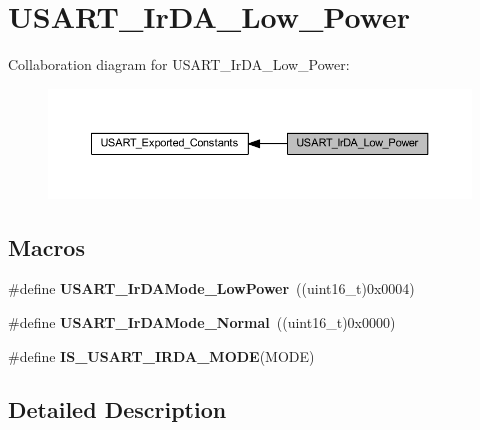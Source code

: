 \hypertarget{group___u_s_a_r_t___ir_d_a___low___power}{}\section{U\+S\+A\+R\+T\+\_\+\+Ir\+D\+A\+\_\+\+Low\+\_\+\+Power}
\label{group___u_s_a_r_t___ir_d_a___low___power}
Collaboration diagram for U\+S\+A\+R\+T\+\_\+\+Ir\+D\+A\+\_\+\+Low\+\_\+\+Power\+:
\nopagebreak
\begin{figure}[H]
\begin{center}
\leavevmode
\includegraphics[width=350pt]{group___u_s_a_r_t___ir_d_a___low___power}
\end{center}
\end{figure}
\subsection*{Macros}
\begin{DoxyCompactItemize}
\item 
\mbox{\label{group___u_s_a_r_t___ir_d_a___low___power_ga00c2635d0e6ca1a5b158f1c1673e862f}} 
\#define {\bfseries U\+S\+A\+R\+T\+\_\+\+Ir\+D\+A\+Mode\+\_\+\+Low\+Power}~((uint16\+\_\+t)0x0004)
\item 
\mbox{\label{group___u_s_a_r_t___ir_d_a___low___power_ga796cd5451deb896741206986bd6d03e6}} 
\#define {\bfseries U\+S\+A\+R\+T\+\_\+\+Ir\+D\+A\+Mode\+\_\+\+Normal}~((uint16\+\_\+t)0x0000)
\item 
\#define {\bfseries I\+S\+\_\+\+U\+S\+A\+R\+T\+\_\+\+I\+R\+D\+A\+\_\+\+M\+O\+DE}(M\+O\+DE)
\end{DoxyCompactItemize}


\subsection{Detailed Description}


